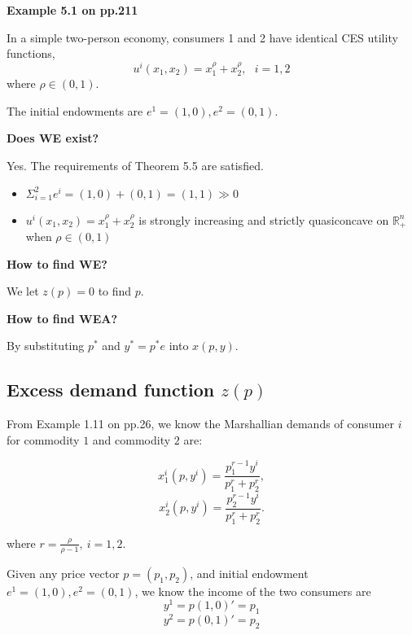 \documentclass{article}
\newcommand{\R}{\mathbb{R}}
\begin{document}
\vspace{2mm}

\begin{mdframed}[backgroundcolor=blue!20,linecolor=white]
\textbf{Example 5.1 on pp.211}

In a simple two-person economy, consumers 1 and 2 have identical CES utility functions,
$$u^i(x_1,x_2) = x^\rho_1 + x^\rho_2, \ \ \ i= 1,2$$
where $\rho \in (0,1)$.

The initial endowments are $e^1 = (1,0), e^2 = (0,1)$.

\vspace{2mm}

\textbf{Does WE exist?}

Yes. The requirements of Theorem 5.5 are satisfied.

\begin{itemize}
\item $\Sigma_{i=1}^{2} e^i = (1,0) + (0,1) = (1,1) \gg 0$
\item $u^i(x_1,x_2) = x^\rho_1 + x^\rho_2$ is strongly increasing and strictly quasiconcave on $\R^n_{+}$ when $\rho \in (0,1)$
\end{itemize}


\textbf{How to find WE? }

We let $z(p)=0$ to find $p$.

\vspace{2mm}

\textbf{How to find WEA? }

By substituting $p^*$ and $y^* = p^*e$ into $x(p,y)$.

\end{mdframed}

\subsection{Excess demand function $z(p)$}


From Example 1.11 on pp.26, we know the Marshallian demands of consumer $i$ for commodity $1$ and commodity $2$ are:

$$x^i_1(p,y^i) = \frac{p^{r-1}_1y^i}{p_1^r+p_2^r},$$
$$x^i_2(p,y^i) = \frac{p^{r-1}_2y^i}{p_1^r+p_2^r}.$$

where $r= \frac{\rho}{\rho-1},\ i = 1,2$.

Given any price vector $p = (p_1,p_2)$, and initial endowment $e^1 = (1,0), e^2 = (0,1)$, we know the income of the two consumers are 
$$y^1= p(1,0)' = p_1$$
$$y^2= p(0,1)' = p_2$$
\end{document}

